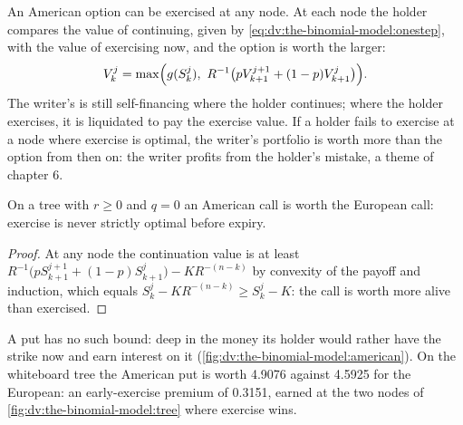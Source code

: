 An American option can be exercised at any node. At each node the holder compares
the value of continuing, given by \eqref{eq:dv:the-binomial-model:onestep}, with
the value of exercising now, and the option is worth the larger:
\[
V_k^j=\max\Bigl(g(S_k^j),\ R^{-1}\bigl(pV_{k+1}^{j+1}+(1-p)V_{k+1}^{j}\bigr)\Bigr).
\]
The writer's  is still self-financing where the holder
continues; where the holder exercises, it is liquidated to pay the exercise
value. If a holder fails to exercise at a node where exercise is optimal, the
writer's portfolio is worth more than the option from then on: the writer
profits from the holder's mistake, a theme of chapter 6.

\begin{proposition}\label{prop:dv:the-binomial-model:call}
On a tree with $r\ge0$ and $q=0$ an American call is worth the European call:
exercise is never strictly optimal before expiry.
\end{proposition}
\begin{proof}
At any node the continuation value is at least
$R^{-1}\bigl(pS_{k+1}^{j+1}+(1-p)S_{k+1}^{j}\bigr)-KR^{-(n-k)}$ by convexity of the
payoff and induction, which equals $S_k^j-KR^{-(n-k)}\ge S_k^j-K$: the call is
worth more alive than exercised.
\end{proof}

A put has no such bound: deep in the money its holder would rather have the
strike now and earn interest on it (\cref{fig:dv:the-binomial-model:american}).
On the whiteboard tree the American put is worth 4.9076 against 4.5925 for the
European: an early-exercise premium of 0.3151, earned at the two nodes of
\cref{fig:dv:the-binomial-model:tree} where exercise wins.

